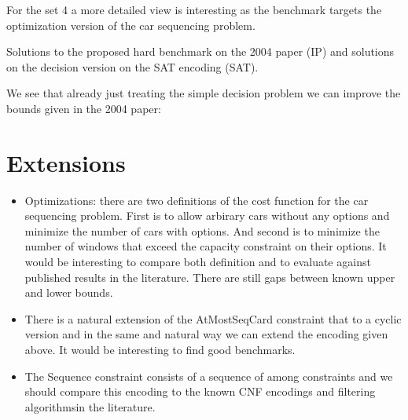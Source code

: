 \documentclass[]{llncs}
\begin{document}
For the set 4 a more detailed view is interesting as the benchmark
targets the optimization version of the car sequencing problem. 

\DTLsetseparator{,}

\begin{table}[htbp]
    \caption{Solutions to the proposed hard benchmark on the 2004 paper
    (IP) and solutions on the decision version on the SAT encoding
(SAT). }
    \centering
\end{table}


We see that already just treating the simple decision problem we can
improve the bounds given in the 2004 paper: 


\section{Extensions}

\begin{itemize}
    \item Optimizations: there are two definitions of the cost function
        for the car sequencing problem. First is to allow arbirary cars
        without any options and minimize the number of cars with
        options. And second is to minimize the number of windows that
        exceed the capacity constraint on their options. It would be
        interesting to compare both definition and to evaluate against
        published results in the literature. There are still gaps
        between known upper and lower bounds. 
    \item There is a natural extension of the AtMostSeqCard constraint
        that to a cyclic version and in the same and natural way we can
        extend the encoding given above. It would be interesting to find
        good benchmarks. 
    \item The Sequence constraint consists of a sequence of among
        constraints and we should compare this encoding to the known CNF
        encodings and filtering algorithmsin the literature. 
\end{itemize}
\end{document}
